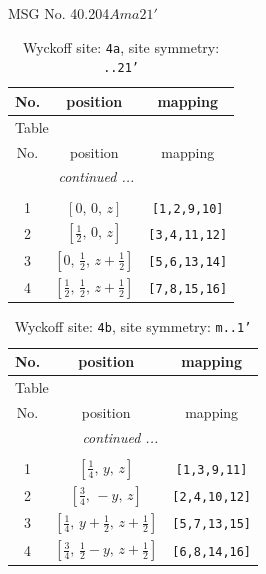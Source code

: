 \documentclass[fleqn,8pt]{jsarticle}
\begin{document}
\setcounter{MaxMatrixCols}{32}

\renewcommand{\tablename}{Table~}
\renewcommand{\figurename}{Figure~}
\begin{center}
\LARGE
MSG No. 40.204\quad$Ama21'$
\end{center}
\renewcommand{\arraystretch}{1.2}
\begin{longtable}{ccc}
\caption{Wyckoff site: {\tt 4a}, site symmetry: {\tt ..21'}}
 \\
 \hline \hline
No. & position & mapping \\ \hline \endfirsthead

\multicolumn{2}{l}{\tablename\ \thetable{}} \\
 \hline \hline
No. & position & mapping \\ \hline \endhead

 \hline \hline
\multicolumn{2}{r}{\footnotesize\it continued ...} \\ \endfoot

 \hline \hline
\multicolumn{2}{r}{} \\ \endlastfoot

1 & $\left[ 0,\, 0,\, z \right]$ & {\tt [1,2,9,10]} \\ \hline
2 & $\left[ \frac{1}{2},\, 0,\, z \right]$ & {\tt [3,4,11,12]} \\ \hline
3 & $\left[ 0,\, \frac{1}{2},\, z + \frac{1}{2} \right]$ & {\tt [5,6,13,14]} \\ \hline
4 & $\left[ \frac{1}{2},\, \frac{1}{2},\, z + \frac{1}{2} \right]$ & {\tt [7,8,15,16]} \\
\end{longtable}
\renewcommand{\arraystretch}{1.2}
\begin{longtable}{ccc}
\caption{Wyckoff site: {\tt 4b}, site symmetry: {\tt m..1'}}
 \\
 \hline \hline
No. & position & mapping \\ \hline \endfirsthead

\multicolumn{2}{l}{\tablename\ \thetable{}} \\
 \hline \hline
No. & position & mapping \\ \hline \endhead

 \hline \hline
\multicolumn{2}{r}{\footnotesize\it continued ...} \\ \endfoot

 \hline \hline
\multicolumn{2}{r}{} \\ \endlastfoot

1 & $\left[ \frac{1}{4},\, y,\, z \right]$ & {\tt [1,3,9,11]} \\ \hline
2 & $\left[ \frac{3}{4},\, - y,\, z \right]$ & {\tt [2,4,10,12]} \\ \hline
3 & $\left[ \frac{1}{4},\, y + \frac{1}{2},\, z + \frac{1}{2} \right]$ & {\tt [5,7,13,15]} \\ \hline
4 & $\left[ \frac{3}{4},\, \frac{1}{2} - y,\, z + \frac{1}{2} \right]$ & {\tt [6,8,14,16]} \\
\end{longtable}
\end{document}
